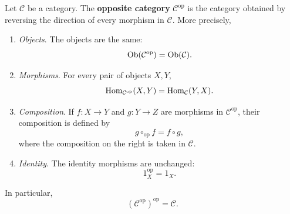 	\begin{definition}
	  \label{def:opposite-category}
		Let $\mathcal C$ be a category. The \textbf{opposite category}
		$\mathcal C^{\mathrm{op}}$ is the category obtained by reversing
		the direction of every morphism in $\mathcal C$. More precisely,
		\begin{enumerate}
			\item \textit{Objects}. The objects are the same:
				\begin{equation}
					\operatorname{Ob}(\mathcal C^{\mathrm{op}}) = \operatorname{Ob}(\mathcal C).
				\end{equation}

			\item \textit{Morphisms}. For every pair of objects $X,Y$,
				\begin{equation}
					\operatorname{Hom}_{\mathcal C^{\mathrm{op}}}(X,Y)
					= \operatorname{Hom}_{\mathcal C}(Y,X).
				\end{equation}

			\item \textit{Composition}. If $f: X \to Y$ and
				$g: Y \to Z$ are morphisms in $\mathcal C^{\mathrm{op}}$,
				their composition is defined by
				\begin{equation}
					g \circ_{\mathrm{op}} f = f \circ g,
				\end{equation}
				where the composition on the right is taken in $\mathcal C$.

			\item \textit{Identity}. The identity morphisms are unchanged:
				\begin{equation}
					1_X^{\mathrm{op}} = 1_X.
				\end{equation}
		\end{enumerate}
		In particular,
		\begin{equation}
			(\mathcal C^{\mathrm{op}})^{\mathrm{op}} = \mathcal C.
		\end{equation}
	\end{definition}


